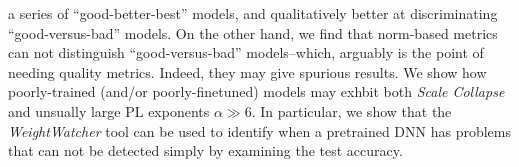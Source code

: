 a series of ``good-better-best'' models, and qualitatively better at discriminating ``good-versus-bad'' models.
On the other hand, we find that norm-based metrics can not distinguish ``good-versus-bad'' models--which, 
arguably is the point of needing quality metrics.  Indeed, they may give spurious results.
We show how poorly-trained (and/or poorly-finetuned) models may exhbit both \emph{Scale Collapse}
and unsually large PL exponents $\alpha\gg 6$.  In particular, we show that the \emph{WeightWatcher} tool
can be used to identify when a pretrained DNN has problems that can not be detected simply
by examining the test accuracy.




